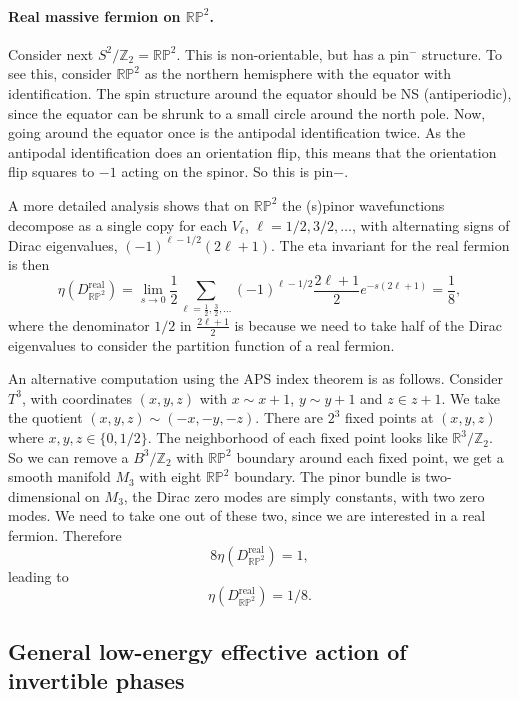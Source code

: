 \documentclass[12pt]{article}
\numberwithin{equation}{section}
\numberwithin{figure}{section}
\theoremstyle{remark}
\def\bR{\mathbb{R}}
\def\bZ{\mathbb{Z}}
\def\RP{\mathbb{RP}}
\begin{document}
\paragraph{Real massive fermion on $\RP^2$. }
Consider next $S^2/\bZ_2=\RP^2$. This is non-orientable, but has a pin$^-$ structure.
To see this, consider $\RP^2$ as the northern hemisphere with the equator with identification.
The spin structure around the equator should be NS (antiperiodic), since the equator can be shrunk to a small circle around
the north pole.
Now, going around the equator once is the antipodal identification twice.
As the antipodal identification does an orientation flip, 
this means that the orientation flip squares to $-1$ acting on the spinor. So this is pin$-$.

A more detailed analysis shows that on $\RP^2$ the (s)pinor wavefunctions decompose
as a single copy for each $V_\ell$, $\ell=1/2,3/2,\ldots$,
with alternating signs of Dirac eigenvalues, $(-1)^{\ell-1/2} (2\ell+1)$. 
The eta invariant for the real fermion is then \begin{equation}
\eta(D_{\RP^2}^\text{real})=
\lim_{s\to 0}\frac12\sum_{\ell=\frac12,\frac32,\ldots} (-1)^{\ell-1/2} \frac{2\ell+1}{2} e^{-s(2\ell+1)} = \frac18,
\end{equation}
where the denominator $1/2$ in $\frac{2\ell+1}{2}$ is because we need to take half of the Dirac eigenvalues
to consider the partition function of a real fermion.

An alternative computation using the APS index theorem is as follows. 
Consider $T^3$, with coordinates $(x,y,z)$ with $x\sim x+1$, $y\sim y+1$ and $z\in z+1$.
We take the quotient $(x,y,z)\sim (-x,-y,-z)$.
There are $2^3$ fixed points at $(x,y,z)$ where $x,y,z\in \{0,1/2\}$.
The neighborhood of each fixed point looks like $\bR^3/\bZ_2$.
So we can remove a $B^3/\bZ_2$ with $\RP^2$ boundary around each fixed point,
we get a smooth manifold $M_3$ with eight $\RP^2$ boundary.
The pinor bundle is two-dimensional on $M_3$, the Dirac zero modes are simply constants,
with two zero modes. We need to take one out of these two, since we are interested in a real fermion.
Therefore \begin{equation}
8\eta(D_{\RP^2}^\text{real})=1,
\end{equation} leading to \begin{equation}
\eta(D_{\RP^2}^\text{real})=1/8.
\end{equation}

\subsection{General low-energy effective action of invertible phases}
\end{document}
